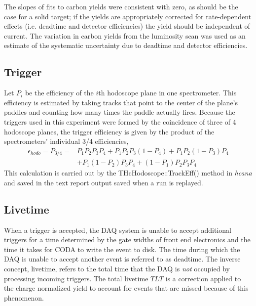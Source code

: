 The slopes of fits to carbon yields were consistent with zero, as should be the
case for a solid target;
if the yields are appropriately corrected for rate-dependent effects (i.e.
deadtime and detector efficiencies) the yield should be independent of current.
The variation in carbon yields from the luminosity scan was used as an estimate
of the systematic uncertainty due to deadtime and detector efficiencies.

\subsection{Trigger}
Let $P_i$ be the efficiency of the $i$th hodoscope plane in one spectrometer.
This efficiency is estimated by taking tracks that point to the center of
the plane's paddles and counting how many times the paddle actually fires.
Because the triggers used in this experiment were formed by the coincidence of
three of 4 hodoscope planes, the trigger efficiency is given by the product of
the spectrometers' individual 3/4 efficiencies,
\begin{align}
    \epsilon_{hodo} = P_{3/4} =& P_{1} P_{2} P_{3} P_{4}+P_{1} P_{2} P_{3}\left(1-P_{4}\right)+P_{1} P_{2}\left(1-P_{3}\right) P_{4} \\
              &+P_{1}\left(1-P_{2}\right) P_{3} P_{4}+\left(1-P_{1}\right) P_{2} P_{3} P_{4}
\end{align}
This calculation is carried out by the THcHodoscope::TrackEff() method in
\textit{hcana} and saved in the text report output saved when a run is
replayed.

\subsection{Livetime} \label{sec:livetime}
When a trigger is accepted, the DAQ system is unable to accept additional
triggers for a time determined by the gate widths of front end electronics and
the time it takes for CODA to write the event to disk.
The time during which the DAQ is unable to accept another event is referred to
as deadtime.
The inverse concept, livetime, refers to the total time that the DAQ is
\textit{not} occupied by processing incoming triggers.
The total livetime $TLT$ is a correction applied to the charge normalized yield
to account for events that are missed because of this phenomenon.

